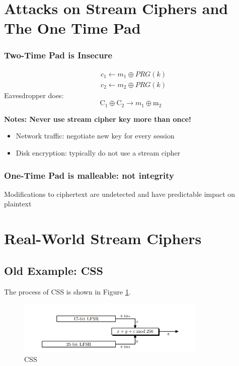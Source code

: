 \section{Attacks on Stream Ciphers and The One Time Pad}

\subsubsection{Two-Time Pad is Insecure}

$$
\begin{aligned}
&c_{1} \leftarrow m_{1} \oplus P R G(k) \\
&c_{2} \leftarrow m_{2} \oplus P R G(k)
\end{aligned}
$$
Eavesdropper does:
$$
\mathrm{C}_{1} \oplus \mathrm{C}_{2} \rightarrow m_{1} \oplus \mathrm{m}_{2}
$$


\textbf{Notes: Never use stream cipher key more than once!}
\begin{itemize} [itemsep=2pt,topsep=0pt,parsep=0pt]
    \item Network traffic: negotiate new key for every session
    \item Disk encryption: typically do not use a stream cipher
\end{itemize}


\subsubsection{One-Time Pad is malleable: not integrity}

Modifications to ciphertext are undetected and  have predictable impact on plaintext

\section{Real-World Stream Ciphers}

\subsection{Old Example: CSS}

The process of CSS is shown in Figure \ref{fig: 02 CSS}.

\begin{figure}[h]
    \centering
    \includegraphics[width=0.8\textwidth]{Stanford_Crypto_1/fig/02_Stream_Cipher/CSS Stream Cipher.png}
    \caption{CSS}
    \label{fig: 02 CSS}
\end{figure}

